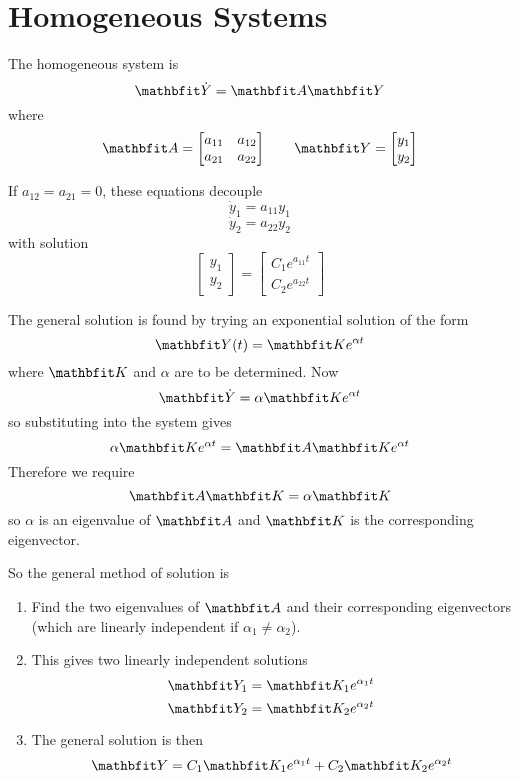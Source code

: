 \section{Homogeneous Systems}

The homogeneous system is
$$\vect{\dot{Y}}=\vect{A}\vect{Y}$$
where
$$\vect{A}=\begin{bmatrix}  a_{11} & a_{12} \\ a_{21} & a_{22} \end{bmatrix}
\qquad
\vect{Y}=\begin{bmatrix}   y_1 \\ y_2	\end{bmatrix}$$

\begin{example}
If $a_{12}=a_{21}=0$, these equations decouple
$$\dot{y}_1=a_{11}y_1$$
$$\dot{y}_2=a_{22}y_2$$
with solution
$$\begin{bmatrix} y_1 \\ y_2 \end{bmatrix}=
\begin{bmatrix} C_1e^{a_{11}t} \\ C_2e^{a_{22}t} \end{bmatrix}$$
\end{example}

The general solution is found by trying an exponential solution of the form
$$\vect{Y}(t)=\vect{K}e^{\alpha t}$$
where $\vect{K}$ and $\alpha$ are to be determined.  Now 
$$\vect{\dot{Y}}=\alpha\vect{K}e^{\alpha t}$$
so substituting into the \ODE system gives
$$\alpha\vect{K}e^{\alpha t}=\vect{A}\vect{K}e^{\alpha t}$$
Therefore we require
$$\vect{A}\vect{K}=\alpha\vect{K}$$
so $\alpha$ is an eigenvalue of $\vect{A}$ and $\vect{K}$ is the
corresponding eigenvector.

So the general method of solution is
\begin{enumerate}
\item Find the two eigenvalues of $\vect{A}$ and their corresponding
eigenvectors (which are linearly independent if $\alpha_1\neq \alpha_2$).
\item This gives two linearly independent solutions
$$\vect{Y}_1=\vect{K}_1e^{\alpha_1t}$$
$$\vect{Y}_2=\vect{K}_2e^{\alpha_2t}$$
\item The general solution is then
$$\vect{Y}=C_1\vect{K}_1e^{\alpha_1t}+C_2\vect{K}_2e^{\alpha_2t}$$
\end{enumerate}

